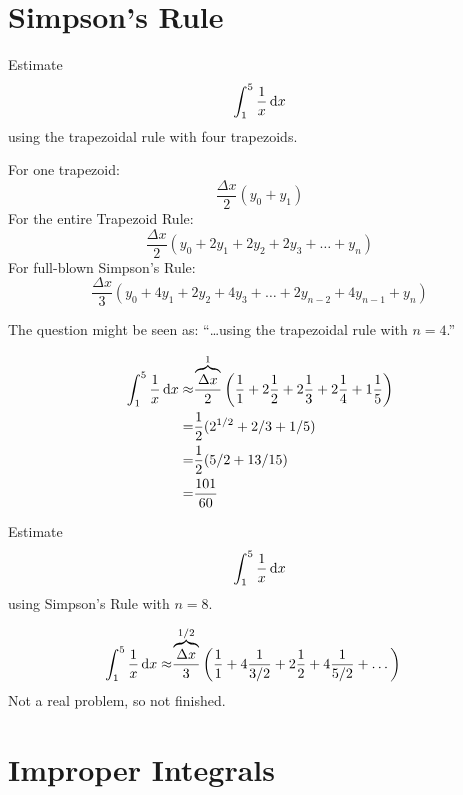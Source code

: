 \section{Simpson's Rule}
\begin{ex}
  Estimate
  \[ \int^5_1 \frac{1}{x}\,\mathrm{d} x \]
  using the trapezoidal rule with four trapezoids.
  \begin{remark}
    For one trapezoid:
      \[ \frac{\Delta x}{2}(y_0+y_1) \]
    For the entire Trapezoid Rule:
      \[ \frac{\Delta x}{2}(y_0+2y_1+2y_2+2y_3+\dots+y_n) \]
    For full-blown Simpson's Rule:
      \[ \frac{\Delta x}{3}(y_0+4y_1+2y_2+4y_3+ \dots +2y_{n-2}+ 4y_{n-1}+y_n) \]
  \end{remark}
  \begin{remark}
    The question might be seen as: ``\dots using the trapezoidal rule with $n=4$.''
  \end{remark}
  \begin{sol}
  \begin{align*}
    \int^5_1 \frac{1}{x}\,\mathrm{d} x
      \approx & \frac{\overbrace{\Delta x}^1}{2}
        \left(\frac{1}{1}+2 \frac{1}{2}+2 \frac{1}{3}+ 2 \frac{1}{4}+1 \frac{1}{5}\right)
        \\
      =& \frac{1}{2}(2^{1/2}+2/3+1/5) \\
      =& \frac{1}{2}(5/2+13/15) \\
      =& \frac{101}{60}
  \end{align*}
\end{sol}
\end{ex}
\begin{ex}
  Estimate
  \[ \int^5_1 \frac{1}{x}\,\mathrm{d} x \]
  using Simpson's Rule with $n=8$.

  \begin{sol}
  \begin{align*}
  \int^5_1 \frac{1}{x}\,\mathrm{d} x
   \approx & \frac{\overbrace{\Delta x}^{1/2}}{3}
     \left(\frac{1}{1}+4 \frac{1}{3/2}+2 \frac{1}{2} + 4 \frac{1}{5/2}+ \dots \right)
  \end{align*}
  Not a real problem, so not finished.
\end{sol}
\end{ex}


\section{Improper Integrals}

